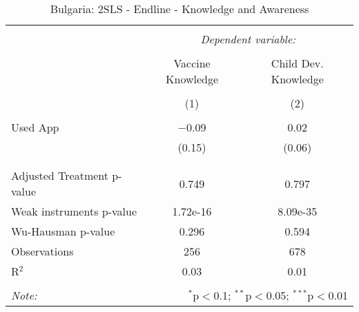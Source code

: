 
\begin{table}[!htbp] \centering 
  \caption{Bulgaria: 2SLS - Endline - Knowledge and Awareness} 
  \label{tbl:Bulgaria: 2SLS - Endline - Knowledge and Awareness} 
\begin{tabular}{@{\extracolsep{5pt}}lcc} 
\\[-1.8ex]\hline 
\hline \\[-1.8ex] 
 & \multicolumn{2}{c}{\textit{Dependent variable:}} \\ 
\cline{2-3} 
\\[-1.8ex] & Vaccine Knowledge & Child Dev. Knowledge \\ 
\\[-1.8ex] & (1) & (2)\\ 
\hline \\[-1.8ex] 
 Used App & $-$0.09 & 0.02 \\ 
  & (0.15) & (0.06) \\ 
  & & \\ 
\hline \\[-1.8ex] 
Adjusted Treatment p-value & 0.749 & 0.797 \\ 
Weak instruments p-value & 1.72e-16 & 8.09e-35 \\ 
Wu-Hausman p-value & 0.296 & 0.594 \\ 
Observations & 256 & 678 \\ 
R$^{2}$ & 0.03 & 0.01 \\ 
\hline 
\hline \\[-1.8ex] 
\textit{Note:}  & \multicolumn{2}{r}{$^{*}$p$<$0.1; $^{**}$p$<$0.05; $^{***}$p$<$0.01} \\ 
\end{tabular} 
\end{table} 
